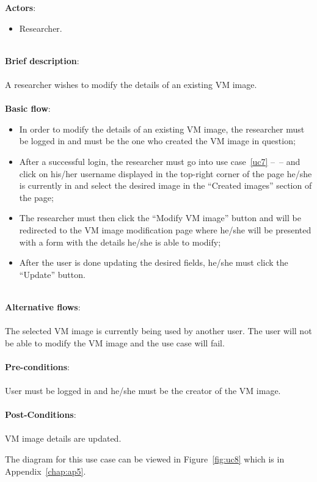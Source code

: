 \textbf{Actors}:

\begin{itemize}
\item Researcher.
\end{itemize}

\ \\
\textbf{Brief description}:\\
\ \\
A researcher wishes to modify the details of an existing VM image.\\
\ \\
\textbf{Basic flow}:

\begin{itemize}
\item In order to modify the details of an existing VM image, the researcher must be logged in and must be the one who created the VM image in question;
\item After a successful login, the researcher must go into use case~\ref{uc7} --~-- and click on his/her username displayed in the top-right corner of the page he/she is currently in and select the desired image in the ``Created images'' section of the page;
\item The researcher must then click the ``Modify VM image'' button and will be redirected to the VM image modification page where he/she will be presented with a form with the details he/she is able to modify;
\item After the user is done updating the desired fields, he/she must click the ``Update'' button.
\end{itemize}

\ \\
\textbf{Alternative flows}:\\
\ \\
The selected VM image is currently being used by another user. The user will not be able to modify the VM image and the use case will fail.\\
\ \\
\textbf{Pre-conditions}:\\
\ \\
User must be logged in and he/she must be the creator of the VM image.\\
\ \\
\textbf{Post-Conditions}:\\
\ \\
VM image details are updated.

The diagram for this use case can be viewed in Figure~\ref{fig:uc8} which is in Appendix~\ref{chap:ap5}.

